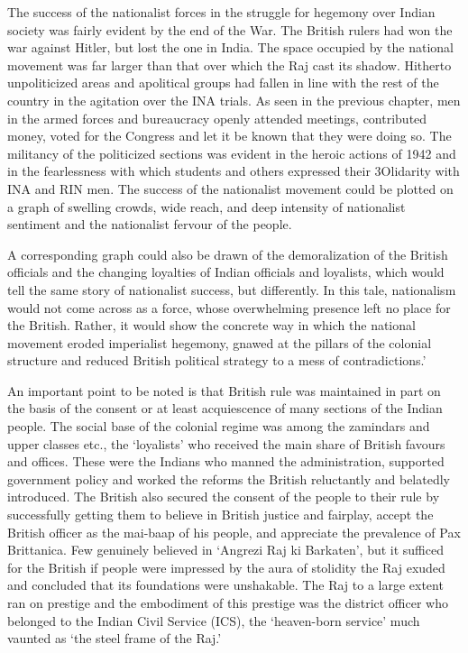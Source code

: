 The success of the nationalist forces in the struggle for hegemony over Indian society was fairly evident by the end of the War. The British rulers had won the war against Hitler, but lost the one in India. The space occupied by the national movement was far larger than that over which the Raj cast its shadow. Hitherto unpoliticized areas and apolitical groups had fallen in line with the rest of the country in the agitation over the INA trials. As seen in the previous chapter, men in the armed forces and bureaucracy openly attended meetings, contributed money, voted for the Congress and let it be known that they were doing so. The militancy of the politicized sections was evident in the heroic actions of 1942 and in the fearlessness with which students and others expressed their 3Olidarity with INA and RIN men. The success of the nationalist movement could be plotted on a graph of swelling crowds, wide reach, and deep intensity of nationalist sentiment and the nationalist fervour of the people. 

A corresponding graph could also be drawn of the demoralization of the British officials and the changing loyalties of Indian officials and loyalists, which would tell the same story of nationalist success, but differently. In this tale, nationalism would not come across as a force, whose overwhelming presence left no place for the British. Rather, it would show the concrete way in which the national movement eroded imperialist hegemony, gnawed at the pillars of the colonial structure and reduced British political strategy to a mess of contradictions.' 

An important point to be noted is that British rule was maintained in part on the basis of the consent or at least acquiescence of many sections of the Indian people. The social base of the colonial regime was among the zamindars and upper classes etc., the `loyalists' who received the main share of British favours and offices. These were the Indians who manned the administration, supported government policy and worked the reforms the British reluctantly and belatedly introduced. The British also secured the consent of the people to their rule by successfully getting them to believe in British justice and fairplay, accept the British officer as the mai-baap of his people, and appreciate the prevalence of Pax Brittanica. Few genuinely believed in `Angrezi Raj ki Barkaten', but it sufficed for the British if people were impressed by the aura of stolidity the Raj exuded and concluded that its foundations were unshakable. The Raj to a large extent ran on prestige and the embodiment of this prestige was the district officer who belonged to the Indian Civil Service (ICS), the `heaven-born service' much vaunted as `the steel frame of the Raj.' 

